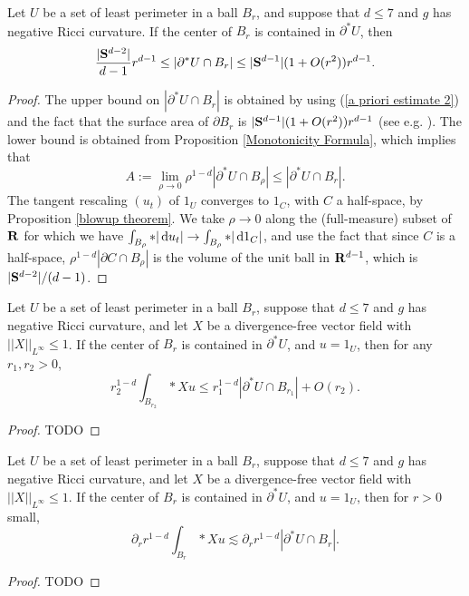 \begin{proposition}\label{doubling dimension}
Let $U$ be a set of least perimeter in a ball $B_r$, and suppose that $d \leq 7$ and $g$ has negative Ricci curvature.
If the center of $B_r$ is contained in $\partial^* U$, then 
$$\frac{|\mathbf S^{d - 2}|}{d - 1} r^{d - 1} \leq |\partial^*U \cap B_r| \leq |\mathbf S^{d - 1}|(1 + O(r^2))r^{d - 1}.$$
\end{proposition}
\begin{proof}
The upper bound on $|\partial^* U \cap B_r|$ is obtained by using (\ref{a priori estimate 2}) and the fact that the surface area of $\partial B_r$ is $|\mathbf S^{d - 1}|(1 + O(r^2))r^{d - 1}$ (see e.g. \cite{gray1974volume}).
The lower bound is obtained from Proposition \ref{Monotonicity Formula}, which implies that 
$$A := \lim_{\rho \to 0} \rho^{1 - d} |\partial^* U \cap B_\rho| \leq |\partial^* U \cap B_r|.$$
The tangent rescaling $(u_t)$ of $1_U$ converges to $1_C$, with $C$ a half-space, by Proposition \ref{blowup theorem}.
We take $\rho \to 0$ along the (full-measure) subset of $\mathbf{R}$ for which we have $\int_{B_\rho} *|\mathop{}\!\mathrm{d} u_t| \to \int_{B_\rho} *|\mathop{}\!\mathrm{d} 1_C|$,
and use the fact that since $C$ is a half-space, $\rho^{1-d} |\partial C \cap B_\rho|$ is the volume of the unit ball in $\mathbf{R}^{d - 1}$, which is $|\mathbf S^{d - 2}|/(d - 1)$.
\end{proof}

\begin{corollary}\label{scalar curvature monotonicity}
Let $U$ be a set of least perimeter in a ball $B_r$, suppose that $d \leq 7$ and $g$ has negative Ricci curvature, and let $X$ be a divergence-free vector field with $||X||_{L^\infty} \leq 1$.
If the center of $B_r$ is contained in $\partial^* U$, and $u = 1_U$, then for any $r_1, r_2 > 0$,
\begin{equation}\label{scalar curvature equation}
r_2^{1 - d}\int_{B_{r_2}} *Xu \leq r_1^{1 - d}|\partial^*U \cap B_{r_1}| + O(r_2).
\end{equation}
\end{corollary}
\begin{proof}
TODO
\end{proof}

\begin{corollary}\label{bounding the G}
Let $U$ be a set of least perimeter in a ball $B_r$, suppose that $d \leq 7$ and $g$ has negative Ricci curvature, and let $X$ be a divergence-free vector field with $||X||_{L^\infty} \leq 1$.
If the center of $B_r$ is contained in $\partial^* U$, and $u = 1_U$, then for $r > 0$ small,
$$\partial_r r^{1 - d} \int_{B_r} *Xu \lesssim \partial_r r^{1 - d} |\partial^* U \cap B_r|.$$
\end{corollary}
\begin{proof}
TODO
\end{proof}


